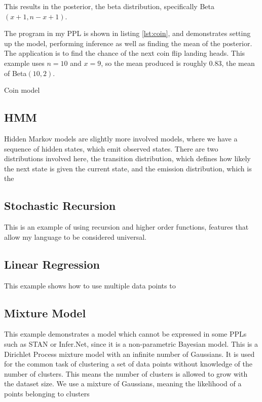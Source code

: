 This results in the posterior, the beta distribution, specifically Beta$(x+1,n-x+1)$. 

The program in my PPL is shown in listing \ref{lst:coin}, and demonstrates setting up the model, performing inference as well as finding the mean of the posterior. The application is to find the chance of the next coin flip landing heads. This example uses $n=10$ and $x=9$, so the mean produced is roughly 0.83, the mean of Beta$(10,2)$.

\begin{listing}[!ht]
	\caption{Coin model}
	\label{lst:coin}
\end{listing}

\subsection{HMM}
Hidden Markov models are slightly more involved models, where we have a sequence of hidden states, which emit observed states. There are two distributions involved here, the transition distribution, which defines how likely the next state is given the current state, and the emission distribution, which is the 

\subsection{Stochastic Recursion}
This is an example of using recursion and higher order functions, features that allow my language to be considered universal.

\subsection{Linear Regression}
This example shows how to use multiple data points to 

\subsection{Mixture Model}
This example demonstrates a model which cannot be expressed in some PPLs such as STAN or Infer.Net, since it is a non-parametric Bayesian model. This is a Dirichlet Process mixture model with an infinite number of Gaussians\cite{dpmm}. It is used for the common task of clustering a set of data points without knowledge of the number of clusters. This means the number of clusters is allowed to grow with the dataset size. We use a mixture of Gaussians, meaning the likelihood of a points belonging to clusters 

